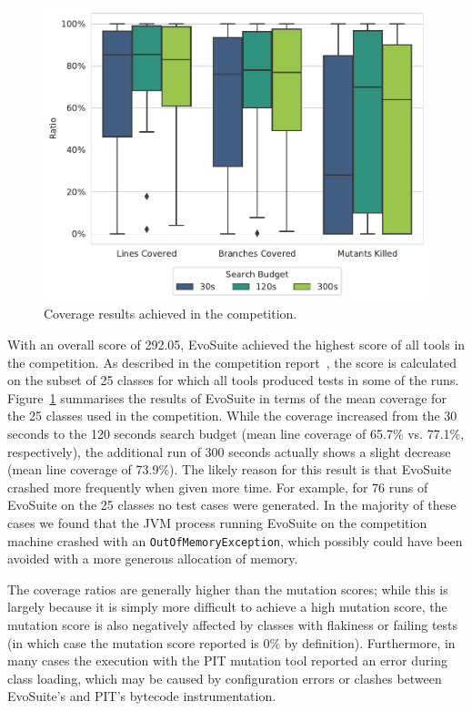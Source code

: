 \documentclass[10pt,conference]{IEEEtran}
\newcommand{\EVOSUITE}{{\sc EvoSuite}\xspace}
\begin{document}
\begin{figure}
	\centering
	\includegraphics[width=\columnwidth]{CoverageBoxV}
	\caption{\label{fig:results}Coverage results achieved in the competition.}
\end{figure}


With an overall score of 292.05, \EVOSUITE achieved the highest score of all
tools in the competition. As described in the competition
report~\cite{SBST:2021}, the score is calculated on the subset of 25 classes
for which all tools produced tests in some of the runs.
Figure~\ref{fig:results} summarises the results of \EVOSUITE in terms of the
mean coverage for the 25 classes used in the competition. While the coverage
increased from the 30 seconds to the 120 seconds search budget (mean line
coverage of 65.7\% vs. 77.1\%, respectively), the additional run of 300 seconds
actually shows a slight decrease (mean line coverage of 73.9\%). The likely
reason for this result is that \EVOSUITE crashed more frequently when given
more time. For example, for 76 runs of \EVOSUITE on the 25 classes no test
cases were generated. In the majority of these cases we found that the JVM
process running \EVOSUITE on the competition machine crashed with an
\texttt{OutOfMemoryException}, which possibly could have been avoided with a
more generous allocation of memory.

The coverage ratios are generally higher than the mutation scores; while this is largely because it is simply more difficult to achieve a high mutation score, the mutation score is also negatively affected by classes with flakiness or failing tests (in which case the mutation score reported is 0\% by definition). Furthermore, in many cases the execution with the PIT mutation tool reported an error during class loading, which may be caused by configuration errors or clashes between \EVOSUITE's and PIT's bytecode instrumentation.
\end{document}
